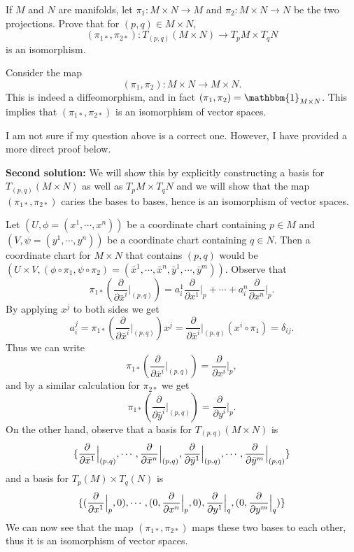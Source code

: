 \begin{problem}
	If $ M $ and $ N $ are manifolds, let $ \pi_1: M\times N \to M $ and $ \pi_2: M\times N \to N $ be the two projections. Prove that for $ (p,q) \in M\times N $,
	\[ (\pi_{1*},\pi_{2*}) : T_{(p,q)}(M\times N) \to T_p M \times T_q N \]
	is an isomorphism.
\end{problem}
\begin{solution}
	Consider the map
	\[ (\pi_1,\pi_2) : M\times N \to M\times N. \]
	This is indeed a diffeomorphism, and in fact $ (\pi_1,\pi_2) = \mathbbm{1}_{M\times N} $. This implies that $ (\pi_{1*},\pi_{2*}) $ is an isomorphism of vector spaces.
\end{solution}
\begin{carefull}
	I am not sure if my question above is a correct one. However, I have provided a more direct proof below.
\end{carefull}
\textbf{Second solution:} We will show this by explicitly constructing a basis for $ T_{(p,q)}(M\times N) $ as well as $ T_pM \times T_qN $ and we will show that the map $ (\pi_{1*},\pi_{2*}) $ caries the bases to bases, hence is an isomorphism of vector spaces. 

Let $ (U,\phi=(x^1,\cdots,x^n)) $ be a coordinate chart containing $ p \in M$ and $ (V,\psi=(y^1,\cdots,y^n)) $ be a coordinate chart containing $ q \in N $. Then a coordinate chart for $ M\times N $ that contains $ (p,q) $ would be $ (U\times V, (\phi\circ\pi_1, \psi\circ\pi_2) = (\bar{x}^1,\cdots,\bar{x}^n,\bar{y}^1,\cdots,\bar{y}^m)) $. Observe that 
\[ \pi_{1*}(\frac{\partial}{\partial  \bar{x}^i}\big|_{(p,q)}) = a^1_i \frac{\partial}{\partial  x^1}\big|_{p} + \cdots + a^n_i \frac{\partial}{\partial  x^n}\big|_{p}.  \]
By applying $ x^j $ to both sides we get
\[ a^j_i = \pi_{1*}(\frac{\partial}{\partial  \bar{x}^i}\big|_{(p,q)}) x^j = \frac{\partial}{\partial  \bar{x}^i}\big|_{(p,q)}(x^i\circ \pi_1) = \delta_{ij}. \] 
Thus we can write
\[  \pi_{1*}(\frac{\partial}{\partial  \bar{x}^i}\big|_{(p,q)}) = \frac{\partial}{\partial  x^i}\big|_{p}, \]
and by a similar calculation for $ \pi_{2*} $ we get
\[  \pi_{1*}(\frac{\partial}{\partial  \bar{y}^i}\big|_{(p,q)}) = \frac{\partial}{\partial  y^i}\big|_{p}. \]
On the other hand, observe that a basis for $ T_{(p,q)}(M\times N) $ is 
\[ \{\frac{\partial}{\partial  \bar{x}^1}\big|_{(p,q)},\cdots,\frac{\partial}{\partial  \bar{x}^n}\big|_{(p,q)},\frac{\partial}{\partial  \bar{y}^1}\big|_{(p,q)},\cdots,\frac{\partial}{\partial  \bar{y}^m}\big|_{(p,q)}\} \]
and a basis for $ T_p(M)\times T_q(N) $ is 
\[ \{(\frac{\partial}{\partial  x^1}\big|_{p},0),\cdots,(0,\frac{\partial}{\partial  x^n}\big|_{p},0),\frac{\partial}{\partial  y^1}\big|_{q}, (0,\frac{\partial}{\partial  y^m}\big|_{q})\} \]
We can now see that the map $ (\pi_{1*},\pi_{2*}) $ maps these two bases to each other, thus it is an isomorphism of vector spaces.

